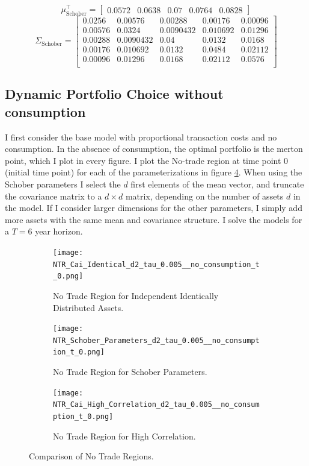 \documentclass[11pt]{article}
\begin{document}
\[
\mu_{\text{Schober}}^\top = 
\begin{bmatrix}
0.0572 & 0.0638 & 0.07 & 0.0764 & 0.0828
\end{bmatrix}
\]
\[
\Sigma_{\text{Schober}} = 
\begin{bmatrix}
0.0256 & 0.00576 & 0.00288 & 0.00176 & 0.00096 \\
0.00576 & 0.0324 & 0.0090432 & 0.010692 & 0.01296 \\
0.00288 & 0.0090432 & 0.04 & 0.0132 & 0.0168 \\
0.00176 & 0.010692 & 0.0132 & 0.0484 & 0.02112 \\
0.00096 & 0.01296 & 0.0168 & 0.02112 & 0.0576 \\
\end{bmatrix}
\]
\subsection{Dynamic Portfolio Choice without consumption} \label{Subsection: Results_NoConsumption}
I first consider the base model with proportional transaction costs
and no consumption. In the absence of consumption, the optimal portfolio is the merton point, which I plot in every figure.
I plot the No-trade region at time point 0 (initial time point) for each of the parameterizations in figure \ref{fig:comparison_NTR}.
When using the Schober parameters I select the $d$ first elements of the mean vector, and truncate the covariance matrix to a $d \times d$ matrix,
depending on the number of assets $d$ in the model. If I consider larger dimensions for the other parameters, I simply add more assets with the same mean and covariance structure.
I solve the models for a $T=6$ year horizon.
\begin{figure}[!ht]
    \centering
    \begin{subfigure}[t]{\textwidth}
        \centering
        \texttt{[image: NTR\_Cai\_Identical\_d2\_tau\_0.005\_\_no\_consumption\_t\_0.png]}
        \caption{No Trade Region for Independent Identically Distributed Assets.}
        \label{fig:NTR_2d_iid}
    \end{subfigure}

    \vspace{1em}

    \begin{subfigure}[t]{0.48\textwidth}
        \centering
        \texttt{[image: NTR\_Schober\_Parameters\_d2\_tau\_0.005\_\_no\_consumption\_t\_0.png]}
        \caption{No Trade Region for Schober Parameters.}
        \label{fig:NTR_2d_Schober}
    \end{subfigure}%
    \hfill
    \begin{subfigure}[t]{0.48\textwidth}
        \centering
        \texttt{[image: NTR\_Cai\_High\_Correlation\_d2\_tau\_0.005\_\_no\_consumption\_t\_0.png]}
        \caption{No Trade Region for High Correlation.}
        \label{fig:NTR_2d_High_Correlation}
    \end{subfigure}

    \caption{Comparison of No Trade Regions.}
    \label{fig:comparison_NTR}
\end{figure}
\end{document}
